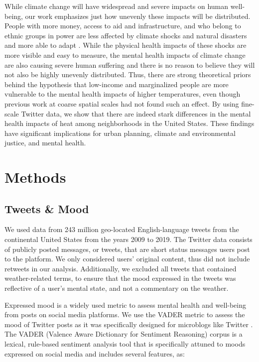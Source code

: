 \documentclass[fleqn,10pt]{wlscirep}
\begin{document}
While climate change will have widespread and severe impacts on human well-being, our work emphasizes just how unevenly these impacts will be distributed. People with more money, access to aid and infrastructure, and who belong to ethnic groups in power are less affected by climate shocks and natural disasters and more able to adapt \cite{bullard2012wrong}. While the physical health impacts of these shocks are more visible and easy to measure, the mental health impacts of climate change are also causing severe human suffering and there is no reason to believe they will not also be highly unevenly distributed. Thus, there are strong theoretical priors behind the hypothesis that low-income and marginalized people are more vulnerable to the mental health impacts of higher temperatures, even though previous work at coarse spatial scales had not found such an effect. By using fine-scale Twitter data, we show that there are indeed stark differences in the mental health impacts of heat among neighborhoods in the United States. These findings have significant implications for urban planning, climate and environmental justice, and mental health.

\section*{Methods}
\subsection*{Tweets \& Mood}
We used data from 243 million geo-located English-language tweets from the continental United States from the years 2009 to 2019. The Twitter data consists of publicly posted messages, or tweets, that are short status messages users post to the platform. We only considered users’ original content, thus did not include retweets in our analysis. Additionally, we excluded all tweets that contained weather-related terms, to ensure that the mood expressed in the tweets was reflective of a user's mental state, and not a commentary on the weather.

Expressed mood is a widely used metric to assess mental health and well-being from posts on social media platforms. We use the VADER metric to assess the mood of Twitter posts as it was specifically designed for microblogs like Twitter \cite{hutto2014vader}. The VADER (Valence Aware Dictionary for Sentiment Reasoning) corpus \cite{gilbert_vader_2014} is a lexical, rule-based sentiment analysis tool that is specifically attuned to moods expressed on social media and includes several features, as:
\end{document}
